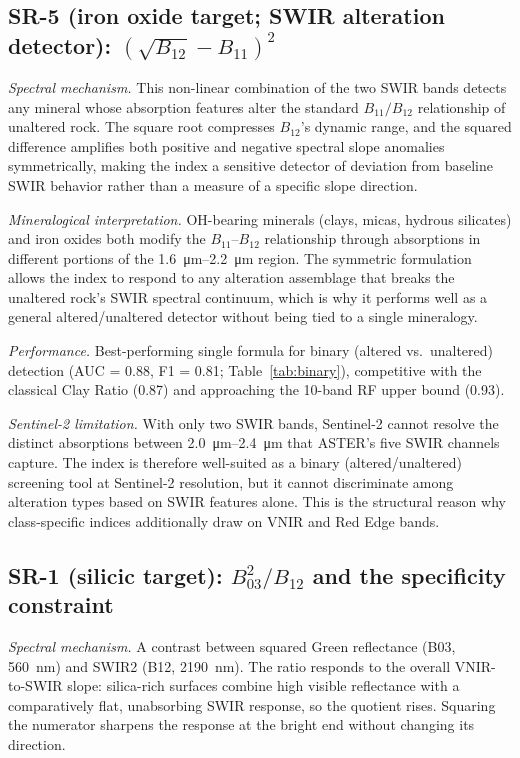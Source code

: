\documentclass[preprint,authoryear,number]{elsarticle}
\begin{document}
\subsection{SR-5 (iron oxide target; SWIR alteration detector): $(\sqrt{B_{12}} - B_{11})^2$}

\emph{Spectral mechanism.} This non-linear combination of the two SWIR bands detects any mineral whose absorption features alter the standard $B_{11}/B_{12}$ relationship of unaltered rock. The square root compresses $B_{12}$'s dynamic range, and the squared difference amplifies both positive and negative spectral slope anomalies symmetrically, making the index a sensitive detector of deviation from baseline SWIR behavior rather than a measure of a specific slope direction.

\emph{Mineralogical interpretation.} OH-bearing minerals (clays, micas, hydrous silicates) and iron oxides both modify the $B_{11}$--$B_{12}$ relationship through absorptions in different portions of the \SIrange{1.6}{2.2}{\micro\meter} region. The symmetric formulation allows the index to respond to any alteration assemblage that breaks the unaltered rock's SWIR spectral continuum, which is why it performs well as a general altered/unaltered detector without being tied to a single mineralogy.

\emph{Performance.} Best-performing single formula for binary (altered vs.\ unaltered) detection (AUC = 0.88, F1 = 0.81; Table~\ref{tab:binary}), competitive with the classical Clay Ratio (0.87) and approaching the 10-band RF upper bound (0.93).

\emph{Sentinel-2 limitation.} With only two SWIR bands, Sentinel-2 cannot resolve the distinct absorptions between \SIrange{2.0}{2.4}{\micro\meter} that ASTER's five SWIR channels capture. The index is therefore well-suited as a binary (altered/unaltered) screening tool at Sentinel-2 resolution, but it cannot discriminate among alteration types based on SWIR features alone. This is the structural reason why class-specific indices additionally draw on VNIR and Red Edge bands.

\subsection{SR-1 (silicic target): $B_{03}^2 / B_{12}$ and the specificity constraint}

\emph{Spectral mechanism.} A contrast between squared Green reflectance (B03, \SI{560}{\nano\meter}) and SWIR2 (B12, \SI{2190}{\nano\meter}). The ratio responds to the overall VNIR-to-SWIR slope: silica-rich surfaces combine high visible reflectance with a comparatively flat, unabsorbing SWIR response, so the quotient rises. Squaring the numerator sharpens the response at the bright end without changing its direction.
\end{document}
